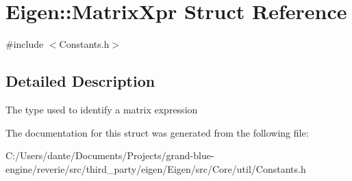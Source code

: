 \hypertarget{struct_eigen_1_1_matrix_xpr}{}\section{Eigen\+::Matrix\+Xpr Struct Reference}
\label{struct_eigen_1_1_matrix_xpr}


{\ttfamily \#include $<$Constants.\+h$>$}



\subsection{Detailed Description}
The type used to identify a matrix expression 

The documentation for this struct was generated from the following file\+:\begin{DoxyCompactItemize}
\item 
C\+:/\+Users/dante/\+Documents/\+Projects/grand-\/blue-\/engine/reverie/src/third\+\_\+party/eigen/\+Eigen/src/\+Core/util/Constants.\+h\end{DoxyCompactItemize}
